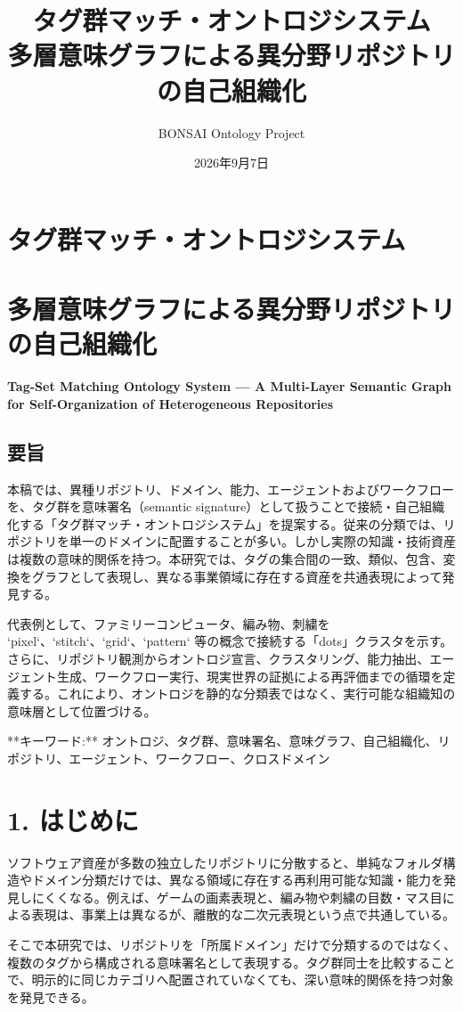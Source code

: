 \documentclass[a4paper,11pt]{jsarticle}
\title{タグ群マッチ・オントロジシステム\\\large 多層意味グラフによる異分野リポジトリの自己組織化}
\author{BONSAI Ontology Project}
\date{2026年9月7日}
\begin{document}
\maketitle
\section*{タグ群マッチ・オントロジシステム}
\section{多層意味グラフによる異分野リポジトリの自己組織化}
\textbf{Tag-Set Matching Ontology System — A Multi-Layer Semantic Graph for Self-Organization of Heterogeneous Repositories}\par
\subsection{要旨}
本稿では、異種リポジトリ、ドメイン、能力、エージェントおよびワークフローを、タグ群を意味署名（semantic signature）として扱うことで接続・自己組織化する「タグ群マッチ・オントロジシステム」を提案する。従来の分類では、リポジトリを単一のドメインに配置することが多い。しかし実際の知識・技術資産は複数の意味的関係を持つ。本研究では、タグの集合間の一致、類似、包含、変換をグラフとして表現し、異なる事業領域に存在する資産を共通表現によって発見する。


代表例として、ファミリーコンピュータ、編み物、刺繍を `pixel`、`stitch`、`grid`、`pattern` 等の概念で接続する「dots」クラスタを示す。さらに、リポジトリ観測からオントロジ宣言、クラスタリング、能力抽出、エージェント生成、ワークフロー実行、現実世界の証拠による再評価までの循環を定義する。これにより、オントロジを静的な分類表ではなく、実行可能な組織知の意味層として位置づける。


**キーワード:** オントロジ、タグ群、意味署名、意味グラフ、自己組織化、リポジトリ、エージェント、ワークフロー、クロスドメイン


\section{1. はじめに}
ソフトウェア資産が多数の独立したリポジトリに分散すると、単純なフォルダ構造やドメイン分類だけでは、異なる領域に存在する再利用可能な知識・能力を発見しにくくなる。例えば、ゲームの画素表現と、編み物や刺繍の目数・マス目による表現は、事業上は異なるが、離散的な二次元表現という点で共通している。


そこで本研究では、リポジトリを「所属ドメイン」だけで分類するのではなく、複数のタグから構成される意味署名として表現する。タグ群同士を比較することで、明示的に同じカテゴリへ配置されていなくても、深い意味的関係を持つ対象を発見できる。
\end{document}
